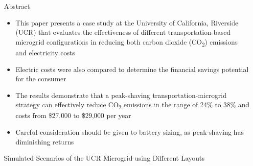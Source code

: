 \documentclass[final, 20 pt]{beamer}
\newlength{\onecolwid}
\begin{document}
\begin{frame}[t]
\begin{columns}[t]
\begin{column}{\onecolwid}
\begin{block}{Abstract}
	\begin{itemize}
		\item This paper presents a case study at the University of California, Riverside (UCR) that evaluates the effectiveness of different transportation-based microgrid configurations in reducing both carbon dioxide (CO\textsubscript{2}) emissions and electricity costs
		\item Electric costs were also compared to determine the financial savings potential for the consumer
		\item The results demonstrate that a peak-shaving transportation-microgrid strategy can effectively reduce CO\textsubscript{2} emissions in the range of 24\% to 38\% and costs from \$27,000 to \$29,000 per year
		\item  Careful consideration should be given to battery sizing, as peak-shaving has diminishing returns
	\end{itemize}
\end{block}

\begin{block}{Simulated Scenarios of the UCR Microgrid using Different Layouts}
	
	\begin{table}
		\caption{Simulated Scenarios of the UCR Microgrid using Different Layouts}
		\scriptsize
		
		\label{tab:scenarios}
	\end{table}
	

\end{block}
\end{column}
\end{columns}
\end{frame}
\end{document}
